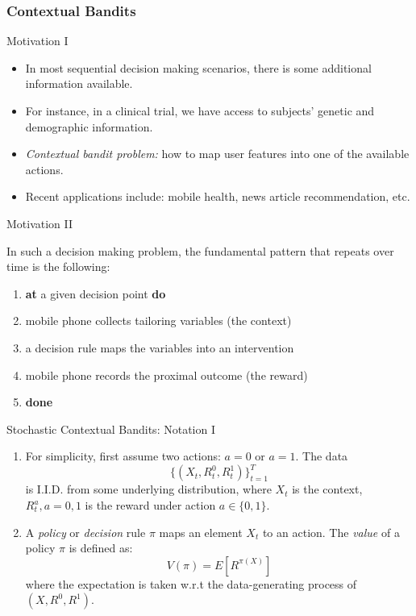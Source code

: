 \documentclass[english]{article}
\begin{document}
\eenum

\subsubsection{Contextual Bandits}

\benum

\item {Motivation I}
\begin{itemize}
    \item In most sequential decision making scenarios, there is some additional information available. 
    \item For instance, in a clinical trial, we have access to subjects' genetic and demographic information.
    \item \emph{Contextual bandit problem:} how to map user features into one of the available actions. 
    \item Recent applications include: mobile health, news article recommendation, etc.
\end{itemize}



\item {Motivation II}

In such a decision making problem, the fundamental pattern that repeats over time is the following:
\begin{enumerate}
    \item \textbf{at} a given decision point \textbf{do}
    \item \quad mobile phone collects tailoring variables (the context)
    \item \quad a decision rule maps the variables into an intervention
    \item \quad mobile phone records the proximal outcome (the reward)
    \item \textbf{done}
\end{enumerate}


\item {Stochastic Contextual Bandits: Notation I}
\begin{enumerate}
    \item
    For simplicity, first assume two actions: $a = 0$ or $a = 1$. The data \[
    \{ (X_t, R_t^0, R_t^1)\}_{t = 1}^T
    \] is I.I.D. from some underlying distribution, where $X_t$ is the context, $R_t^a, a = 0,1$ is the reward under action $a \in \{0,1\} $.  
    \item
    A \emph{policy} or \emph{decision} rule $\pi$ maps an element $X_t$ to an action. The \emph{value} of a policy $\pi$ is defined as: \[
    V(\pi) = E[R^{\pi(X)}]
    \] where the expectation is taken w.r.t the data-generating process of $(X, R^0, R^1)$.
\end{enumerate}
\end{document}
